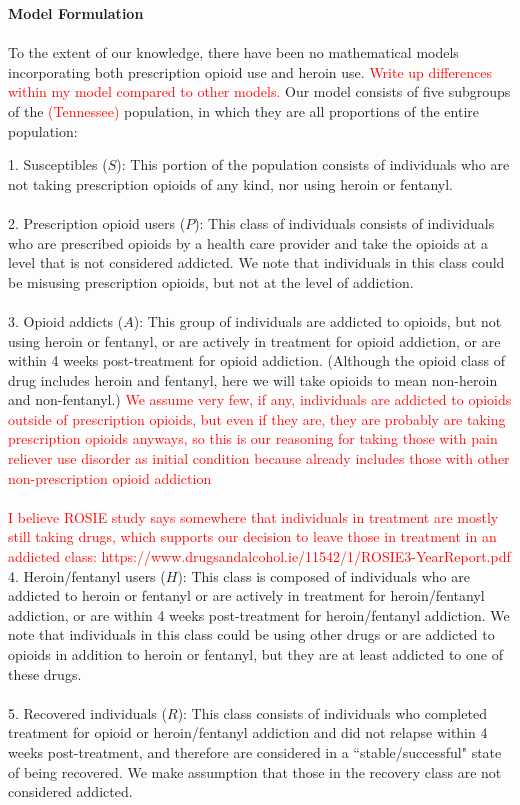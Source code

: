 \documentclass[12pt]{article}
\begin{document}
\textbf{Model Formulation} \\ \\
To the extent of our knowledge, there have been no mathematical models incorporating both prescription opioid use and heroin use. \textcolor{red}{Write up differences within my model compared to other models.}
Our model consists of five subgroups of the \textcolor{red}{(Tennessee)} population, in which they are all proportions of the entire population: 

1. Susceptibles ($S$): This portion of the population consists of individuals who are not taking prescription opioids of any kind, nor using heroin or fentanyl. \\ \\
2. Prescription opioid users ($P$): This class of individuals consists of individuals who are prescribed opioids by a health care provider and take the opioids at a level that is not considered addicted. We note that individuals in this class could be misusing prescription opioids, but not at the level of addiction.  \\ \\ %
3. Opioid addicts ($A$): This group of individuals are addicted to opioids, but not using heroin or fentanyl, or are actively in treatment for opioid addiction, or are within 4 weeks post-treatment for opioid addiction. (Although the opioid class of drug includes heroin and fentanyl, here we will take opioids to mean non-heroin and non-fentanyl.) \textcolor{red}{We assume very few, if any, individuals are addicted to opioids outside of prescription opioids, but even if they are, they are probably are taking prescription opioids anyways, so this is our reasoning for taking those with pain reliever use disorder as initial condition because already includes those with other non-prescription opioid addiction} \\ \\
\textcolor{red}{I believe ROSIE study says somewhere that individuals in treatment are mostly still taking drugs, which supports our decision to leave those in treatment in an addicted class: https://www.drugsandalcohol.ie/11542/1/ROSIE3-YearReport.pdf} \\
4. Heroin/fentanyl users ($H$): This class is composed of individuals who are addicted to heroin or fentanyl or are actively in treatment for heroin/fentanyl addiction, or are within 4 weeks post-treatment for heroin/fentanyl addiction. We note that individuals in this class could be using other drugs or are addicted to opioids in addition to heroin or fentanyl, but they are at least addicted to one of these drugs. \\ \\
5. Recovered individuals ($R$): This class consists of individuals who completed treatment for opioid or heroin/fentanyl addiction and did not relapse within 4 weeks post-treatment, and therefore are considered in a ``stable/successful" state of being recovered. We make assumption that those in the recovery class are not considered addicted.
\end{document}
